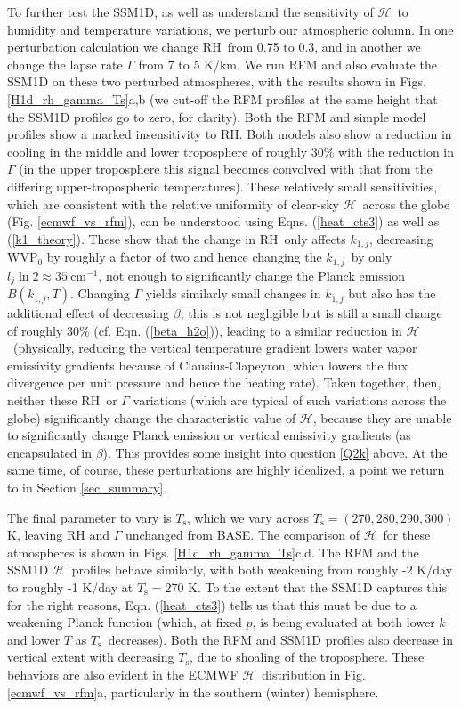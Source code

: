 \documentclass{ametsoc}
\newcommand{\eqnref}[1]{(\ref{#1})}
\newcommand{\cminverse}{\ensuremath{\mathrm{cm^{-1}}}}
\newcommand{\Ts}{\ensuremath{T_\mathrm{s}}}
\newcommand{\RH}{\ensuremath{\mathrm{RH}}}
\newcommand{\ch}{\ensuremath{\mathcal{H}}}
\newcommand{\lj}{\ensuremath{l_j}}
\newcommand{\WVP}{\ensuremath{\mathrm{WVP}}}
\newcommand{\konej}{\ensuremath{k_{1,j}}}
\begin{document}
 To further test the SSM1D,  as well as understand the sensitivity of \ch\ to humidity and temperature variations, we perturb our atmospheric column. In one perturbation calculation we change \RH\ from 0.75 to 0.3, and in another we change the lapse rate $\Gamma$ from  7 to 5 K/km.  We  run RFM and also evaluate the SSM1D on these two perturbed atmospheres, with the results shown in Figs. \ref{H1d_rh_gamma_Ts}a,b  (we cut-off the RFM profiles at the same height that the SSM1D profiles go to zero, for clarity). Both the RFM and simple model profiles show a marked insensitivity to \RH. Both models also show a reduction in cooling in the middle and lower troposphere of roughly $30\%$ with the reduction in $\Gamma$ (in the upper troposphere this signal becomes convolved with that from the differing upper-tropospheric temperatures). These relatively small sensitivities, which are consistent with  the relative uniformity of clear-sky \ch\  across the globe (Fig. \ref{ecmwf_vs_rfm}), can be understood using Eqns. \eqnref{heat_cts3} as well as \eqnref{k1_theory}. These show that the change in \RH\ only affects \konej, decreasing $\WVP_0$ by roughly a factor of two and hence changing the \konej\ by only $\lj\ln 2\approx 35\ \cminverse$, not enough to significantly change the Planck emission $B(\konej,T)$. Changing $\Gamma$  yields similarly small changes in  $\konej$ but also has the additional effect of decreasing $\beta$; this is not negligible but is still a small change of roughly $30\%$  (cf. Eqn. \eqnref{beta_h2o}), leading to a similar reduction in \ch\ (physically, reducing the vertical temperature gradient  lowers  water vapor emissivity gradients because of Clausius-Clapeyron, which lowers the flux divergence per unit pressure and hence the heating rate). Taken together, then, neither these \RH\ or $\Gamma$ variations (which are typical of such variations across the globe) significantly change the characteristic value of \ch, because they are unable to significantly change Planck emission or vertical emissivity gradients (as encapsulated in $\beta$). This provides some insight into question \ref{Q2k} above. At the same time, of course, these perturbations are highly idealized, a point we return to in Section \ref{sec_summary}.

The final parameter to vary is \Ts, which we vary across $\Ts=(270,280,290,300)$ K, leaving $\RH$ and $\Gamma$ unchanged from BASE. The comparison of \ch\ for these atmospheres is shown in Figs. \ref{H1d_rh_gamma_Ts}c,d. The RFM and the SSM1D \ch\ profiles behave similarly, with both weakening  from roughly  -2 K/day to roughly -1 K/day at  $\Ts=270$ K. To the extent that the SSM1D captures this for the right reasons, Eqn. \eqnref{heat_cts3} tells us that this must be due to a weakening Planck function (which, at fixed $p$, is being evaluated at both lower $k$ and lower $T$ as \Ts\ decreases). Both the RFM and SSM1D profiles also decrease in vertical extent with decreasing \Ts, due to shoaling of the troposphere. These behaviors are also evident in the ECMWF \ch\ distribution in Fig. \ref{ecmwf_vs_rfm}a, particularly in the southern (winter) hemisphere. 
\end{document}
